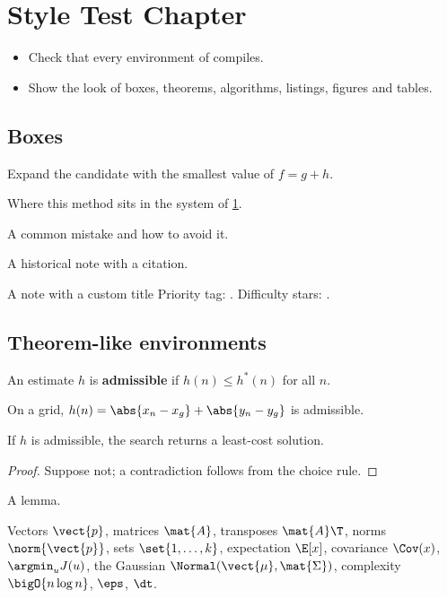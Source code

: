 \chapter{Style Test Chapter}
\label{ch:styletest}
\begin{objectives}
\begin{itemize}
  \item Check that every environment of  compiles.
  \item Show the look of boxes, theorems, algorithms, listings, figures and tables.
\end{itemize}
\end{objectives}
\section{Boxes}
\begin{keyidea}
Expand the candidate with the smallest value of $f = g + h$.
\end{keyidea}
\begin{applicationbox}
Where this method sits in the system of \cref{ch:styletest}.
\end{applicationbox}
\begin{pitfall}
A common mistake and how to avoid it.
\end{pitfall}
\begin{historynote}
A historical note with a citation.
\end{historynote}
\begin{notebox}{A note with a custom title}
Priority tag: . Difficulty stars: .
\end{notebox}
\section{Theorem-like environments}
\begin{definition}\label{def:styletest-adm}
An estimate $h$ is \textbf{admissible} if $h(n) \le h^*(n)$ for all $n$.
\end{definition}
\begin{example}\label{ex:styletest-ex}
On a grid, $h(n) = \abs{x_n - x_g} + \abs{y_n - y_g}$ is admissible.
\end{example}
\begin{theorem}[A theorem]\label{thm:styletest-opt}
If $h$ is admissible, the search returns a least-cost solution.
\end{theorem}
\begin{proof}
Suppose not; a contradiction follows from the choice rule. \qedhere
\end{proof}
\begin{lemma}\label{lem:styletest}
A lemma.
\end{lemma}
\begin{remark}
Vectors $\vect{p}$, matrices $\mat{A}$, transposes $\mat{A}\T$, norms $\norm{\vect{p}}$, sets $\set{1,\dots,k}$, expectation $\E[x]$, covariance $\Cov(x)$, $\argmin_{u} J(u)$, the Gaussian $\Normal(\vect{\mu}, \mat{\Sigma})$, complexity $\bigO{n \log n}$, $\eps$, $\dt$.
\end{remark}

